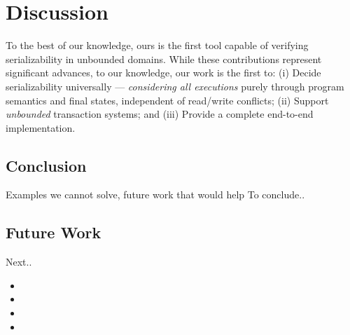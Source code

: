 \section{Discussion}
\label{sec:discussion}

To the best of our knowledge, ours is the first 
tool capable of verifying serializability in unbounded domains.
%
While these contributions represent significant advances, to our knowledge, our 
work is the first to:
(i) Decide serializability universally --- \textit{considering all executions} 
purely through program semantics and final states, independent of read/write 
conflicts; 
(ii) Support \textit{unbounded} transaction systems; and
(iii) Provide a complete end-to-end implementation.

\subsection{Conclusion}
Examples we cannot solve, future work that would help
To conclude..


\subsection{Future Work}
Next..

\begin{itemize}
    \item {}
    \item {}
    \item {}
    \item {}
\end{itemize}